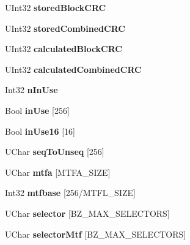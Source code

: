 \begin{DoxyCompactItemize}
U\+Int32 {\bfseries stored\+Block\+C\+RC}
\item 
\mbox{\label{struct_d_state_a56994c118e342ee9c2db1442b0e95842}} 
U\+Int32 {\bfseries stored\+Combined\+C\+RC}
\item 
\mbox{\label{struct_d_state_a0462e219c90047cad4b536108a6ba1b8}} 
U\+Int32 {\bfseries calculated\+Block\+C\+RC}
\item 
\mbox{\label{struct_d_state_a20960d693f2688dc543ecd07fb03a563}} 
U\+Int32 {\bfseries calculated\+Combined\+C\+RC}
\item 
\mbox{\label{struct_d_state_ace9cd79f50a2eb029b34781d9ef696aa}} 
Int32 {\bfseries n\+In\+Use}
\item 
\mbox{\label{struct_d_state_ab33d14c6ab3b51d51bcb871ace899f5f}} 
Bool {\bfseries in\+Use} \mbox{[}256\mbox{]}
\item 
\mbox{\label{struct_d_state_ad03fbe8be0d8aed6ff951d667b6b2f4a}} 
Bool {\bfseries in\+Use16} \mbox{[}16\mbox{]}
\item 
\mbox{\label{struct_d_state_a8fa5a8647fec4b07727ad950da987e3a}} 
U\+Char {\bfseries seq\+To\+Unseq} \mbox{[}256\mbox{]}
\item 
\mbox{\label{struct_d_state_a29373a9edbe6d4838af390242a213ed7}} 
U\+Char {\bfseries mtfa} \mbox{[}M\+T\+F\+A\+\_\+\+S\+I\+ZE\mbox{]}
\item 
\mbox{\label{struct_d_state_ac904f9b1d9853e89cec2e2eb641d5cf2}} 
Int32 {\bfseries mtfbase} \mbox{[}256/M\+T\+F\+L\+\_\+\+S\+I\+ZE\mbox{]}
\item 
\mbox{\label{struct_d_state_a1743228374dd82d180e7681606fab3a5}} 
U\+Char {\bfseries selector} \mbox{[}B\+Z\+\_\+\+M\+A\+X\+\_\+\+S\+E\+L\+E\+C\+T\+O\+RS\mbox{]}
\item 
\mbox{\label{struct_d_state_ac7409a930fc14261a1acd63f522bb41c}} 
U\+Char {\bfseries selector\+Mtf} \mbox{[}B\+Z\+\_\+\+M\+A\+X\+\_\+\+S\+E\+L\+E\+C\+T\+O\+RS\mbox{]}

\end{DoxyCompactItemize}
